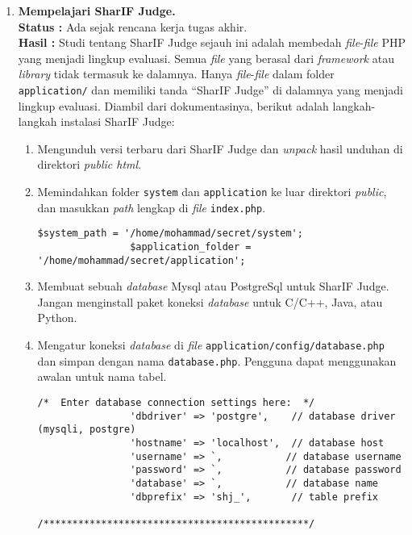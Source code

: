 \documentclass[a4paper,twoside]{article}
\begin{document}
	\begin{enumerate}
		\item \textbf{Mempelajari SharIF Judge.}\\
		{\bf Status :} Ada sejak rencana kerja tugas akhir.\\
		{\bf Hasil :} Studi tentang SharIF Judge sejauh ini adalah membedah \textit{file}-\textit{file} PHP yang menjadi lingkup evaluasi. Semua \textit{file} yang berasal dari \textit{framework} atau \textit{library} tidak termasuk ke dalamnya. Hanya \textit{file}-\textit{file} dalam folder \verb|application/| dan memiliki tanda ``SharIF Judge'' di dalamnya yang menjadi lingkup evaluasi. Diambil dari dokumentasinya, berikut adalah langkah-langkah instalasi SharIF Judge:
		\begin{enumerate}
			\item Mengunduh versi terbaru dari SharIF Judge dan \textit{unpack} hasil unduhan di direktori \textit{public html}.
			\item Memindahkan folder \verb|system| dan \verb|application| ke luar direktori \textit{public}, dan masukkan \textit{path} lengkap di \textit{file} \verb|index.php|.
			\begin{lstlisting}[basicstyle=\ttfamily, frame=single,
				columns=fullflexible, keepspaces=true, breaklines=true, label=ls:2]
				$system_path = '/home/mohammad/secret/system';
				$application_folder = '/home/mohammad/secret/application';
			\end{lstlisting}
			\item Membuat sebuah \textit{database} Mysql atau PostgreSql untuk SharIF Judge. Jangan menginstall paket koneksi \textit{database} untuk C/C++, Java, atau Python.
			\item Mengatur koneksi \textit{database} di \textit{file} \verb|application/config/database.php| dan simpan dengan nama \verb|database.php|. Pengguna dapat
			menggunakan awalan untuk nama tabel.
			\begin{lstlisting}[basicstyle=\ttfamily, frame=single,
				columns=fullflexible, keepspaces=true, breaklines=true, label=ls:3]
				/*  Enter database connection settings here:  */
				'dbdriver' => 'postgre',    // database driver (mysqli, postgre)
				'hostname' => 'localhost',  // database host
				'username' => `,           // database username
				'password' => `,           // database password
				'database' => `,           // database name
				'dbprefix' => 'shj_',       // table prefix
				/**********************************************/
			\end{lstlisting}

\end{enumerate}
\end{enumerate}
\end{document}
